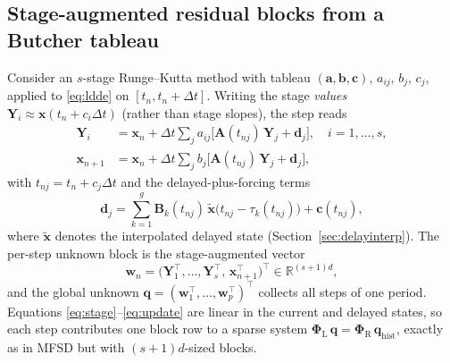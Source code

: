\documentclass[Afour,sageh,times]{sagej}
\begin{document}
\subsection{Stage-augmented residual blocks from a Butcher tableau}
\label{sec:butcher}

Consider an $s$-stage Runge--Kutta method with tableau
$(\mathbf{a}, \mathbf{b}, \mathbf{c})$, $a_{ij},\,b_j,\,c_j$,
applied to \eqref{eq:ldde} on $[t_n, t_n + \Delta t]$. Writing the stage
\emph{values} $\mathbf{Y}_{i}\approx\mathbf{x}(t_n + c_i\Delta t)$ (rather
than stage slopes), the step reads
\begin{align}
  \mathbf{Y}_i &= \mathbf{x}_n + \Delta t \sum_{j} a_{ij}
      \bigl[\mathbf{A}(t_{nj})\,\mathbf{Y}_j + \mathbf{d}_j\bigr],
      \quad i = 1,\ldots,s,
  \label{eq:stage}\\
  \mathbf{x}_{n+1} &= \mathbf{x}_n + \Delta t \sum_{j} b_{j}
      \bigl[\mathbf{A}(t_{nj})\,\mathbf{Y}_j + \mathbf{d}_j\bigr],
  \label{eq:update}
\end{align}
with $t_{nj} = t_n + c_j \Delta t$ and the delayed-plus-forcing terms
\begin{equation}
  \mathbf{d}_j = \sum_{k=1}^{g} \mathbf{B}_k(t_{nj})\,
      \tilde{\mathbf{x}}\bigl(t_{nj} - \tau_k(t_{nj})\bigr) + \mathbf{c}(t_{nj}),
  \label{eq:delayterm}
\end{equation}
where $\tilde{\mathbf{x}}$ denotes the interpolated delayed state
(Section~\ref{sec:delayinterp}). The per-step unknown block is the
stage-augmented vector
\begin{equation}
  \mathbf{w}_n = \bigl(\mathbf{Y}_{1}^\top,\ldots,\mathbf{Y}_{s}^\top,\,
    \mathbf{x}_{n+1}^\top\bigr)^\top
    \in \mathbb{R}^{(s+1)d},
\end{equation}
and the global unknown $\mathbf{q} = (\mathbf{w}_1^\top,\ldots,
\mathbf{w}_p^\top)^\top$ collects all steps of one period. Equations
\eqref{eq:stage}--\eqref{eq:update} are linear in the current and delayed
states, so each step contributes one block row to a sparse system
$\mathbf{\Phi}_\mathrm{L}\,\mathbf{q} = \mathbf{\Phi}_\mathrm{R}\,
\mathbf{q}_\mathrm{hist}$, exactly as in MFSD but with $(s+1)d$-sized blocks.
\end{document}
